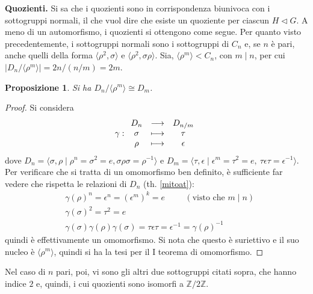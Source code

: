 \documentclass[12pt]{scrartcl}
\theoremstyle{style}
\newtheorem{prop}{Proposizione}[section]
\numberwithin{equation}{subsection}
\begin{document}
\textbf{Quozienti.} 
Si sa che i quozienti sono in corrispondenza biunivoca con i sottogruppi normali, il che vuol dire che esiste un quoziente per ciascun $H \lhd G$.
A meno di un automorfismo, i quozienti si ottengono come segue.
Per quanto visto precedentemente, i sottogruppi normali sono i sottogruppi di $C_n$ e, se $n$ \`e pari, anche quelli della forma $\langle \rho ^2 , \sigma  \rangle$ e $\langle \rho ^2, \sigma \rho  \rangle$. 
Sia, $\langle \rho ^m \rangle< C_n$, con $ m \mid n$, per cui $\lvert D_n / \langle \rho ^m \rangle \rvert = 2n/(n / m) = 2m$.
\begin{prop}
	Si ha $D_n / \langle \rho ^m \rangle\cong D _{m} $.
\end{prop}
	\begin{proof}
		Si considera 
		\[
		\gamma : 
		\begin{array}
			{c c c}
			D_n & \longrightarrow& D_{ n / m } \\
			\sigma & \longmapsto & \tau \\
			\rho & \longmapsto & \epsilon 
		\end{array}
		\] 
		dove $D_n = \langle \sigma ,\rho  \mid \rho ^n = \sigma ^2 = e , \sigma \rho \sigma = \rho ^{-1} \rangle$ e $D_{m} = \langle \tau ,\epsilon  \mid \epsilon ^{ m} = \tau ^2 = e , \ \tau \epsilon \tau = \epsilon ^{-1} \rangle$.
		Per verificare che si tratta di un omomorfismo ben definito, \`e sufficiente far vedere che rispetta le relazioni di $D_n$ (th. \ref{mitoat}):
		\[
			\begin{split}
				&\gamma(\rho )^n=\epsilon ^n = (\epsilon ^m)^k =e \hspace{1cm} (\text{visto che }m  \mid  n)\\
				&\gamma(\sigma )^2 = \tau ^2 = e\\
				&\gamma(\sigma )\gamma(\rho )\gamma(\sigma ) = \tau \epsilon \tau =\epsilon ^{-1}= \gamma(\rho )^{-1}
			\end{split}
		\] 
		quindi \`e effettivamente un omomorfismo.
		Si nota che questo \`e suriettivo e il suo nucleo \`e $\langle \rho ^m \rangle$, quindi si ha la tesi per il I teorema di omomorfismo.
	\end{proof}
\noindent Nel caso di $n$ pari, poi, vi sono gli altri due sottogruppi citati sopra, che hanno indice $2$ e, quindi, i cui quozienti sono isomorfi a $\mathbb{Z} / 2\mathbb{Z}$.
\end{document}
